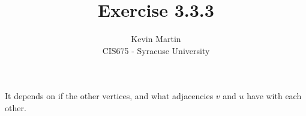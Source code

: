 \documentclass{article}
\author{Kevin Martin\\ CIS675 - Syracuse University}
\title{Exercise 3.3.3}
\begin{document}
\maketitle
It depends on if the other vertices, and what adjacencies $v$ and $u$ have with each other.
\end{document}
